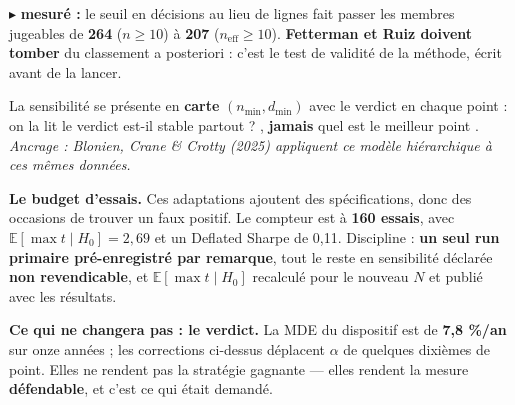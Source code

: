 \documentclass[11pt,a4paper]{article}
\newcommand{\mes}[1]{{\color{rouge}\small$\blacktriangleright$ \textbf{mesuré :} #1}\par}
\begin{document}
\mes{le seuil en décisions au lieu de lignes fait passer les membres jugeables de \textbf{264} ($n \ge 10$) à
\textbf{207} ($n_{\text{eff}} \ge 10$). \textbf{Fetterman et Ruiz doivent tomber} du classement a posteriori : c'est le test
de validité de la méthode, écrit avant de la lancer.}

{\small La sensibilité se présente en \textbf{carte} $(n_{\min}, d_{\min})$ avec le verdict en chaque point : on la lit
\og le verdict est-il stable partout ? \fg{}, \textbf{jamais} \og quel est le meilleur point \fg{}.
\emph{Ancrage : Blonien, Crane \& Crotty (2025) appliquent ce modèle hiérarchique à ces mêmes données.}}

\vspace{2mm}
\begin{mdframed}[linecolor=rouge, backgroundcolor=rouge!5, linewidth=0.7pt, roundcorner=3pt]
\textbf{Le budget d'essais.} Ces adaptations ajoutent des spécifications, donc des occasions de trouver un faux
positif. Le compteur est à \textbf{160 essais}, avec $\mathbb{E}[\max t \mid H_0] = 2{,}69$ et un Deflated Sharpe de 0,11.
Discipline : \textbf{un seul run primaire pré-enregistré par remarque}, tout le reste en sensibilité déclarée
\textbf{non revendicable}, et $\mathbb{E}[\max t \mid H_0]$ recalculé pour le nouveau $N$ et publié avec les résultats.

\vspace{1mm}
\textbf{Ce qui ne changera pas : le verdict.} La MDE du dispositif est de \textbf{7,8 \%/an} sur onze années ; les
corrections ci-dessus déplacent $\alpha$ de quelques dixièmes de point. Elles ne rendent pas la stratégie
gagnante --- elles rendent la mesure \textbf{défendable}, et c'est ce qui était demandé.
\end{mdframed}
\end{document}
